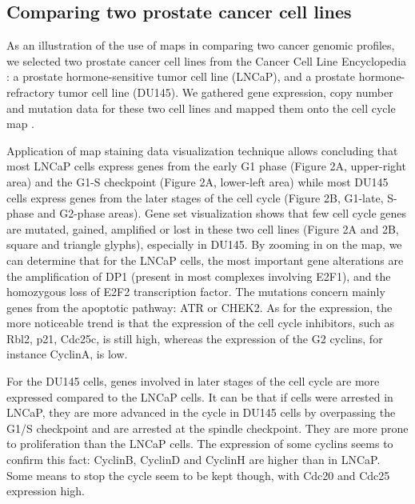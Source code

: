 \documentclass[a4,center,fleqn]{NAR}
\begin{document}
\subsection{Comparing two prostate cancer cell lines}

As an illustration of the use of maps in comparing two cancer genomic profiles, we
selected two prostate cancer cell lines from the Cancer Cell Line Encyclopedia
\cite{barretina2012cancer}: a prostate hormone-sensitive
tumor cell line (LNCaP), and a prostate hormone-refractory tumor cell line
(DU145). We gathered gene expression, copy number and mutation data for
these two cell lines and mapped them onto the cell cycle map
\cite{calzone2008comprehensive}.

Application of map staining data visualization technique allows concluding that
most LNCaP cells express genes from the early G1 phase (Figure 2A, upper-right area) and the G1-S checkpoint
(Figure 2A, lower-left area) while most DU145 cells express genes from the
later stages of the cell cycle (Figure 2B, G1-late, S-phase and G2-phase
areas). Gene set visualization shows that few cell cycle genes are mutated, gained, amplified or lost
in these two cell lines (Figure 2A and 2B, square and triangle glyphs), especially in DU145.
By zooming in on the map, we can determine that for the LNCaP cells, the most
important gene alterations are the amplification of DP1 (present in most
complexes involving E2F1), and the homozygous loss of E2F2 transcription
factor. The mutations concern mainly genes from the apoptotic pathway: ATR or
CHEK2. As for the expression, the more noticeable trend is that the expression
of the cell cycle inhibitors, such as Rbl2, p21, Cdc25c, is still high, whereas
the expression of the G2 cyclins, for instance CyclinA, is low.

For the DU145 cells, genes involved in later stages of the cell cycle are more
expressed compared to the LNCaP cells. It can be that if cells were
arrested in LNCaP, they are more advanced in the cycle in DU145 cells by
overpassing the G1/S checkpoint and are arrested at the spindle checkpoint.
They are more prone to proliferation than the LNCaP cells. The expression of some
cyclins seems to confirm this fact: CyclinB, CyclinD and CyclinH are higher
than in LNCaP. Some means to stop the cycle seem to be kept though, with Cdc20
and Cdc25 expression high.

\end{document}
